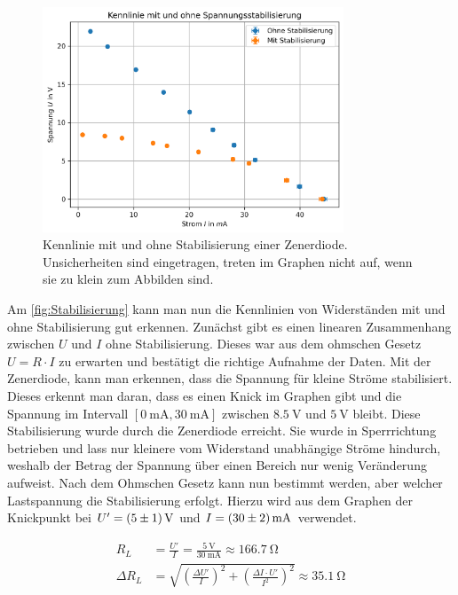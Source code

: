\documentclass{article}
\theoremstyle{definition}
\begin{document}
\begin{figure}[H]
             \centering
             \includegraphics[width=0.8\textwidth]{figs/2.5.png}
             \caption{Kennlinie mit und ohne Stabilisierung einer Zenerdiode. Unsicherheiten sind eingetragen, treten im Graphen nicht auf, wenn sie zu klein zum Abbilden sind.}
             \label{fig:Stabilisierung}
         \end{figure}
         
         
Am \autoref{fig:Stabilisierung} kann man nun die Kennlinien von Widerständen mit und ohne Stabilisierung gut erkennen. Zunächst gibt es einen linearen Zusammenhang zwischen $U$ und $I$ ohne Stabilisierung. Dieses war aus dem ohmschen Gesetz $U= R \cdot I$ zu erwarten und bestätigt die richtige Aufnahme der Daten. Mit der Zenerdiode, kann man erkennen, dass die Spannung für kleine Ströme stabilisiert. Dieses erkennt man daran, dass es einen Knick im Graphen gibt und die Spannung im Intervall $[\SI{0}{\milli \ampere}, \SI{30}{\milli \ampere}]$ zwischen $\SI{8.5}{\volt}$ und $\SI{5}{\volt}$ bleibt. Diese Stabilisierung wurde durch die Zenerdiode erreicht. Sie wurde in Sperrrichtung betrieben und lass nur kleinere vom Widerstand unabhängige Ströme hindurch, weshalb der Betrag der Spannung über einen Bereich nur wenig Veränderung aufweist. Nach dem Ohmschen Gesetz kann nun bestimmt werden, aber welcher Lastspannung die Stabilisierung erfolgt. Hierzu wird aus dem Graphen der Knickpunkt bei $U' = \SI{5\pm 1}{\volt}$ und $I = \SI{30 \pm 2}{\milli \ampere}$ verwendet.

\begin{align}
    R_L &= \frac{U'}{I} = \frac{\SI{5}{\volt}}{\SI{30}{\milli \ampere}} \approx \SI{166.7}{\ohm} \\
    \Delta R_L &= \sqrt{\left( \frac{\Delta U'}{I}\right)^2 + \left( \frac{\Delta I \cdot U'}{I^2}\right)^2} \approx \SI{35.1}{\ohm}
\end{align}
\end{document}
